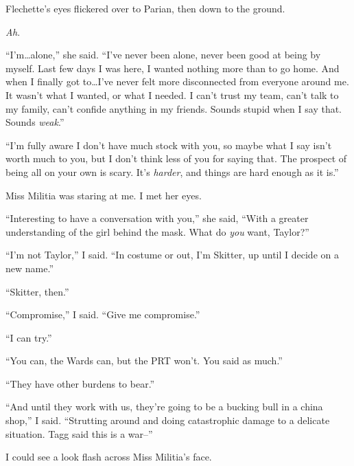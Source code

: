 Flechette's eyes flickered over to Parian, then down to the ground.



\emph{Ah}.



``I'm\ldots alone,'' she said.  ``I've never been alone, never been good at being by myself.  Last few days I was here, I wanted nothing more than to go home.  And when I finally got to\ldots I've never felt more disconnected from everyone around me.  It wasn't what I wanted, or what I needed.  I can't trust my team, can't talk to my family, can't confide anything in my friends.  Sounds stupid when I say that.  Sounds \emph{weak}.''



``I'm fully aware I don't have much stock with you, so maybe what I say isn't worth much to you, but I don't think less of you for saying that.  The prospect of being all on your own is scary.  It's \emph{harder}, and things are hard enough as it is.''



Miss Militia was staring at me.  I met her eyes.



``Interesting to have a conversation with you,'' she said, ``With a greater understanding of the girl behind the mask.  What do \emph{you} want, Taylor?''



``I'm not Taylor,'' I said.  ``In costume or out, I'm Skitter, up until I decide on a new name.''



``Skitter, then.''



``Compromise,'' I said.  ``Give me compromise.''



``I can try.''



``You can, the Wards can, but the PRT won't.  You said as much.''



``They have other burdens to bear.''



``And until they work with us, they're going to be a bucking bull in a china shop,'' I said.  ``Strutting around and doing catastrophic damage to a delicate situation.  Tagg said this is a war--''



I could see a look flash across Miss Militia's face.



